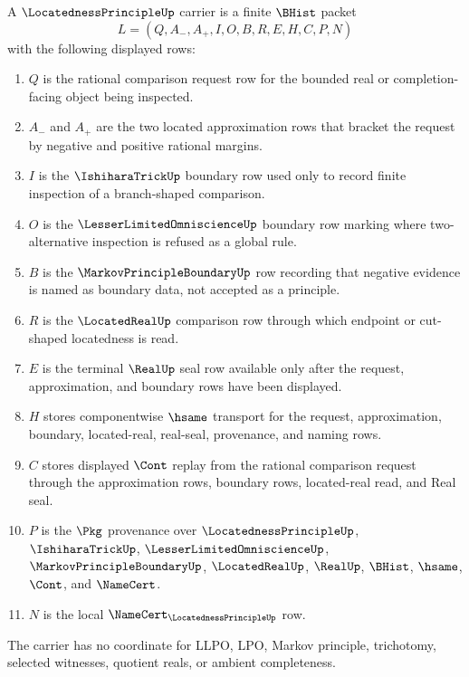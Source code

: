 \begin{definition}
\label{def:locatedness-principle-carrier}
A $\LocatednessPrincipleUp$ carrier is a finite $\BHist$ packet
$$
L=(Q,A_-,A_+,I,O,B,R,E,H,C,P,N)
$$
with the following displayed rows:
\begin{enumerate}
\item $Q$ is the rational comparison request row for the bounded real or completion-facing object being inspected.
\item $A_-$ and $A_+$ are the two located approximation rows that bracket the request by negative and positive rational margins.
\item $I$ is the $\IshiharaTrickUp$ boundary row used only to record finite inspection of a branch-shaped comparison.
\item $O$ is the $\LesserLimitedOmniscienceUp$ boundary row marking where two-alternative inspection is refused as a global rule.
\item $B$ is the $\MarkovPrincipleBoundaryUp$ row recording that negative evidence is named as boundary data, not accepted as a principle.
\item $R$ is the $\LocatedRealUp$ comparison row through which endpoint or cut-shaped locatedness is read.
\item $E$ is the terminal $\RealUp$ seal row available only after the request, approximation, and boundary rows have been displayed.
\item $H$ stores componentwise $\hsame$ transport for the request, approximation, boundary, located-real, real-seal, provenance, and naming rows.
\item $C$ stores displayed $\Cont$ replay from the rational comparison request through the approximation rows, boundary rows, located-real read, and Real seal.
\item $P$ is the $\Pkg$ provenance over $\LocatednessPrincipleUp$, $\IshiharaTrickUp$, $\LesserLimitedOmniscienceUp$, $\MarkovPrincipleBoundaryUp$, $\LocatedRealUp$, $\RealUp$, $\BHist$, $\hsame$, $\Cont$, and $\NameCert$.
\item $N$ is the local $\NameCert_{\LocatednessPrincipleUp}$ row.
\end{enumerate}
The carrier has no coordinate for LLPO, LPO, Markov principle, trichotomy, selected witnesses, quotient reals, or ambient completeness.
\end{definition}

